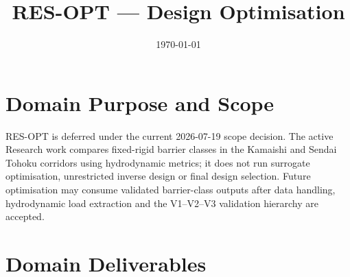 \documentclass[12pt,a4paper]{article}
\title{RES-OPT --- Design Optimisation}
\author{}
\date{\today}
\begin{document}
\maketitle

\tableofcontents
\clearpage

\section{Domain Purpose and Scope}
\label{sec:res-opt-domain-purpose}

RES-OPT is deferred under the current 2026-07-19 scope decision. The
active Research work compares fixed-rigid barrier classes in the
Kamaishi and Sendai Tohoku corridors using hydrodynamic metrics; it
does not run surrogate optimisation, unrestricted inverse design or
final design selection. Future optimisation may consume validated
barrier-class outputs after data handling, hydrodynamic load
extraction and the V1--V2--V3 validation hierarchy are accepted.

\section{Domain Deliverables}
\label{sec:res-opt-domain-deliverables}











\clearpage
\printbibliography[
  heading=bibintoc,
  title={References}
]
\end{document}
